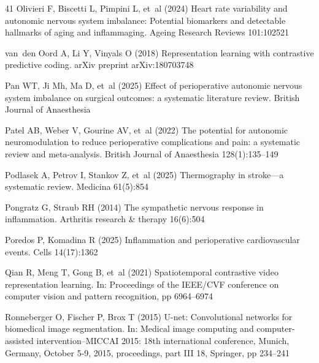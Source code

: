 \documentclass[pdflatex,sn-basic,Numbered]{sn-jnl}
\theoremstyle{thmstyleone}%
\theoremstyle{thmstyletwo}%
\theoremstyle{thmstylethree}%
\begin{document}
\begin{thebibliography}{41}
  Olivieri F, Biscetti L, Pimpini L, et~al (2024) Heart rate variability and
  autonomic nervous system imbalance: Potential biomarkers and detectable
  hallmarks of aging and inflammaging. Ageing Research Reviews 101:102521

  van~den Oord A, Li Y, Vinyals O (2018) Representation learning with
  contrastive predictive coding. arXiv preprint arXiv:180703748

  Pan WT, Ji Mh, Ma D, et~al (2025) Effect of perioperative autonomic nervous
  system imbalance on surgical outcomes: a systematic literature review.
  British Journal of Anaesthesia

  Patel AB, Weber V, Gourine AV, et~al (2022) The potential for autonomic
  neuromodulation to reduce perioperative complications and pain: a systematic
  review and meta-analysis. British Journal of Anaesthesia 128(1):135--149

  Podlasek A, Petrov I, Stankov Z, et~al (2025) Thermography in stroke—a
  systematic review. Medicina 61(5):854

  Pongratz G, Straub RH (2014) The sympathetic nervous response in inflammation.
  Arthritis research \& therapy 16(6):504

  Poredos P, Komadina R (2025) Inflammation and perioperative cardiovascular
  events. Cells 14(17):1362

  Qian R, Meng T, Gong B, et~al (2021) Spatiotemporal contrastive video
  representation learning. In: Proceedings of the IEEE/CVF conference on
  computer vision and pattern recognition, pp 6964--6974

  Ronneberger O, Fischer P, Brox T (2015) U-net: Convolutional networks for
  biomedical image segmentation. In: Medical image computing and
  computer-assisted intervention--MICCAI 2015: 18th international conference,
  Munich, Germany, October 5-9, 2015, proceedings, part III 18, Springer, pp
  234--241


\end{thebibliography}
\end{document}
